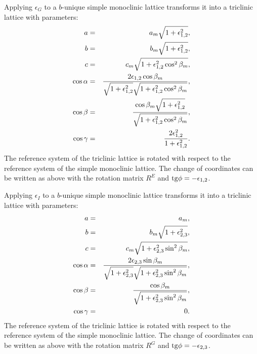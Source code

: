 \documentclass[12pt,a4paper]{article}
\begin{document}
Applying $\epsilon_G$ to a $b$-unique simple monoclinic lattice transforms
it into a triclinic lattice with parameters:
\begin{eqnarray}
a&=&a_m \sqrt{1+\epsilon_{1,2}^2}, \\
b&=&b_m \sqrt{1+\epsilon_{1,2}^2}, \\
c&=&c_m \sqrt{1+\epsilon_{1,2}^2 \cos^2\beta_m}, \\
\cos\alpha &=& {2 \epsilon_{1,2} \cos\beta_m \over 
\sqrt{1+\epsilon_{1,2}^2} \sqrt{1+\epsilon_{1,2}^2 \cos^2\beta_m}}, \\
\cos\beta &=& {\cos\beta_m \sqrt{1+\epsilon_{1,2}^2} \over
\sqrt{1+\epsilon_{1,2}^2 \cos^2\beta_m}}, \\
\cos\gamma &=& {2 \epsilon_{1,2}^2 \over 1+\epsilon_{1,2}^2}.
\end{eqnarray}
The reference system of the triclinic lattice is rotated 
with respect to the reference system of the simple 
monoclinic lattice. 
The change of coordinates can be written as above with the rotation matrix 
$R^E$ and ${\rm tg}\phi=-\epsilon_{1,2}$.

Applying $\epsilon_I$ to a $b$-unique simple monoclinic lattice transforms
it into a triclinic lattice with parameters:
\begin{eqnarray}
a&=&a_m,  \\
b&=&b_m \sqrt{1+\epsilon_{2,3}^2}, \\
c&=&c_m \sqrt{1+\epsilon_{2,3}^2 \sin^2\beta_m}, \\
\cos\alpha &=& {2 \epsilon_{2,3} \sin\beta_m \over 
\sqrt{1+\epsilon_{2,3}^2} \sqrt{1+\epsilon_{2,3}^2 \sin^2\beta_m}}, \\
\cos\beta &=& { \cos\beta_m  \over
\sqrt{1+\epsilon_{2,3}^2 \sin^2\beta_m}}, \\
\cos\gamma &=& 0. 
\end{eqnarray}
The reference system of the triclinic lattice is rotated 
with respect to the reference system of the simple 
monoclinic lattice. 
The change of coordinates can be written as above with the rotation matrix 
$R^G$ and ${\rm tg}\phi=-\epsilon_{2,3}$.
\end{document}
